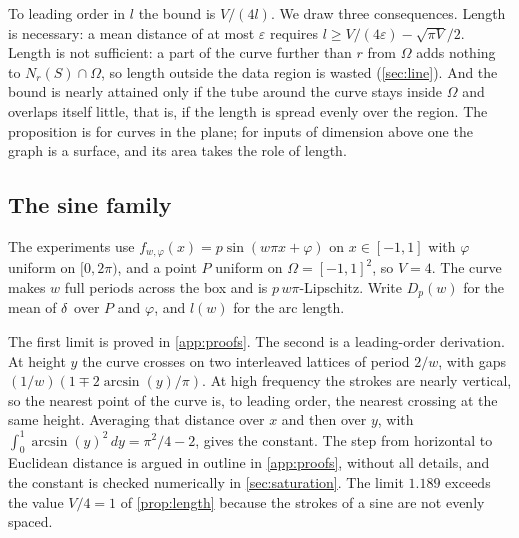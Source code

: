 To leading order in $l$ the bound is $V/(4l)$. We draw three consequences.
Length is necessary: a mean distance of at most $\varepsilon$ requires
$l\ge V/(4\varepsilon)-\sqrt{\pi V}/2$. Length is not sufficient: a part of the
curve further than $r$ from $\Omega$ adds nothing to $N_r(S)\cap\Omega$, so
length outside the data region is wasted (\cref{sec:line}). And the bound is
nearly attained only if the tube around the curve stays inside $\Omega$ and
overlaps itself little, that is, if the length is spread evenly over the
region. The proposition is for curves in the plane; for inputs of dimension
above one the graph is a surface, and its area takes the role of length.

\subsection{The sine family}

The experiments use $f_{w,\varphi}(x)=p\sin(w\pi x+\varphi)$ on $x\in[-1,1]$
with $\varphi$ uniform on $[0,2\pi)$, and a point $P$ uniform on
$\Omega=[-1,1]^2$, so $V=4$. The curve makes $w$ full periods across the box and
is $p\,w\pi$-Lipschitz. Write $D_p(w)$ for the mean of $\delta$ over $P$ and
$\varphi$, and $l(w)$ for the arc length.


The first limit is proved in \cref{app:proofs}. The second is a leading-order
derivation. At height $y$ the curve crosses on two interleaved lattices of
period $2/w$, with gaps $(1/w)(1\mp2\arcsin(y)/\pi)$. At high frequency the
strokes are nearly vertical, so the nearest point of the curve is, to leading
order, the nearest crossing at the same height. Averaging that distance over
$x$ and then over $y$, with $\int_0^1\arcsin(y)^2\,dy=\pi^2/4-2$, gives the
constant. The step from horizontal to Euclidean distance is argued in outline
in \cref{app:proofs}, without all details, and the constant is checked
numerically in \cref{sec:saturation}. The limit $1.189$ exceeds the value
$V/4=1$ of \cref{prop:length} because the strokes of a sine are not evenly
spaced.



